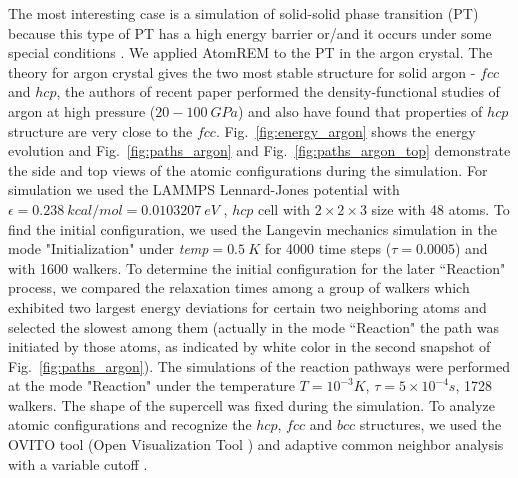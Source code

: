 \documentclass[preprint,12pt]{elsarticle}
\begin{document}
The most interesting case is a simulation of solid-solid phase transition (PT) because this type of PT has a high energy barrier or/and it occurs under some special conditions \cite{Iron_bcc_hcp_fcc}. We applied AtomREM to the PT in the argon crystal. The theory for argon crystal \cite{argon_theory_1957} gives the two most stable structure for solid argon - $fcc$ and $hcp$, the authors of recent paper \cite{DFT_argon_pressure} performed the density-functional studies of argon at high pressure ($20-100~GPa$)  and also have found that properties of $hcp$ structure are very close to the $fcc$. Fig.~\ref{fig:energy_argon} shows the energy evolution and Fig.~\ref{fig:paths_argon} and Fig.~\ref{fig:paths_argon_top} demonstrate the side and top views of the atomic configurations during the simulation. For simulation we used the LAMMPS Lennard-Jones potential with $\epsilon = 0.238~kcal/mol=0.0103207~eV$ \cite{fcc_hcp_1},  $hcp$ cell with $2\times2\times3$ size with 48 atoms. To find the initial configuration, we used the Langevin mechanics simulation in the mode "Initialization" under {\it temp}$=0.5~K$ for 4000 time steps ($\tau = 0.0005$) and with 1600 walkers. To determine the initial configuration for the later ``Reaction" process, we compared the relaxation times among a group of walkers which exhibited two largest energy deviations for certain two neighboring atoms and selected the slowest among them (actually in the mode ``Reaction" the path was initiated by those atoms, as indicated by white color in the second snapshot of Fig.~\ref{fig:paths_argon}). The simulations of the reaction pathways were performed at the mode "Reaction" under the temperature $T=10^{-3}K$, $\tau = 5 \times 10^{-4}s$, 1728 walkers. The shape of the supercell was fixed during the simulation. To analyze atomic configurations and recognize the $hcp$, $fcc$ and $bcc$ structures, we used the OVITO tool (Open Visualization Tool \cite{Stukowski_2009,OVITO}) and adaptive common neighbor analysis with a variable cutoff \cite{CNA}. 

\end{document}
